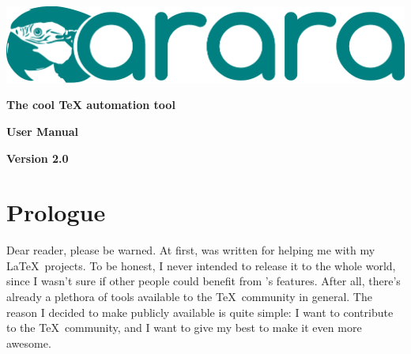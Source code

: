 \documentclass[a4paper,twoside,12pt]{memoir}
\newcommand{\araraversion}{2.0}
\begin{document}
\begin{titlingpage}

\begin{center}
\vspace*{3em}

\includegraphics[scale=.7]{figures/araralogo.pdf}

\vspace{2em}

{\color{araracolor}\bfseries\Huge The cool \TeX{} automation tool}

\vspace{15em}

\begin{mdframed}[innertopmargin=10pt,innerbottommargin=10pt,innerleftmargin=10pt,innerrightmargin=10pt,roundcorner=5pt,linecolor=araracolor,middlelinewidth=2pt]
{\color{araracolor}\bfseries\Huge\Forward\hfill User Manual}
\end{mdframed}

\vfill

{\color{araracolor}\bfseries\LARGE Version \araraversion}

\end{center}

\end{titlingpage}

\frontmatter
{}
\pagestyle{araraheadings}
\nouppercaseheads

\chapter*{Prologue}
\label{chap:prologue}

Dear reader, please be warned. At first, \arara was written for helping me with my \LaTeX\ projects. To be honest, I never intended to release it to the whole world, since I wasn't sure if other people could benefit from \arara's features. After all, there's already a plethora of tools available to the \TeX\ community in general. The reason I decided to make \arara publicly available is quite simple: I want to contribute to the \TeX\ community, and I want to give my best to make it even more awesome.
\end{document}
